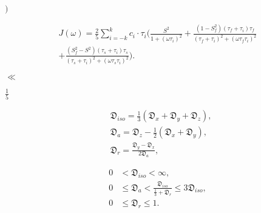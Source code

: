 \documentclass[a4paper,11pt,twoside,openright]{book}
\def\lthtmlcheckvsize{\ifdim\ht\sizebox<\vsize 
  \ifdim\wd\sizebox<\hsize\expandafter\hfill\fi \expandafter\vfill
  \else\expandafter\vss\fi}%
\begin{document}
{\newpage\clearpage
{}%
$\displaystyle \Bigg)$%
\lthtmlindisplaymathZ
\lthtmlcheckvsize\clearpage}

{\newpage\clearpage
{}%
\begin{multline}
    J(\omega) = \frac{2}{5} \sum_{i=-k}^k c_i \cdot \tau_i \Bigg(
        \frac{S^2}{1 + (\omega \tau_i)^2}
        + \frac{(1 - S^2_f)(\tau_f + \tau_i)\tau_f}{(\tau_f + \tau_i)^2 + (\omega \tau_f \tau_i)^2}       \\
        + \frac{(S^2_f - S^2)(\tau_s + \tau_i)\tau_s}{(\tau_s + \tau_i)^2 + (\omega \tau_s \tau_i)^2}
    \Bigg).
\end{multline}%
\lthtmldisplayZ
\lthtmlcheckvsize\clearpage}

{\newpage\clearpage
{}%
$ \ll$%
\lthtmlindisplaymathZ
\lthtmlcheckvsize\clearpage}

{\newpage\clearpage
{}%
$\displaystyle {\frac{{1}}{{5}}}$%
\lthtmlindisplaymathZ
\lthtmlcheckvsize\clearpage}

{\newpage\clearpage
\setcounter{equation}{8}
%
\begin{subequations}\begin{align}
& \mathfrak{D}_{iso} = \tfrac{1}{3} (\mathfrak{D}_x + \mathfrak{D}_y + \mathfrak{D}_z ),\\
& \mathfrak{D}_a = \mathfrak{D}_z - \tfrac{1}{2}(\mathfrak{D}_x + \mathfrak{D}_y),\\
& \mathfrak{D}_r = \frac{\mathfrak{D}_y - \mathfrak{D}_x}{2\mathfrak{D}_a},\end{align}\end{subequations}%
\lthtmldisplayZ
\lthtmlcheckvsize\clearpage}

{\newpage\clearpage
\setcounter{equation}{9}
%
\begin{subequations}\begin{align}
0 & < \mathfrak{D}_{iso} < \infty,\\
0 & \le \mathfrak{D}_a < \frac{\mathfrak{D}_{iso}}{\tfrac{1}{3} + \mathfrak{D}_r} \le 3\mathfrak{D}_{iso},\\
0 & \le \mathfrak{D}_r \le 1.\end{align}\end{subequations}%
\lthtmldisplayZ
\lthtmlcheckvsize\clearpage}
\end{document}
